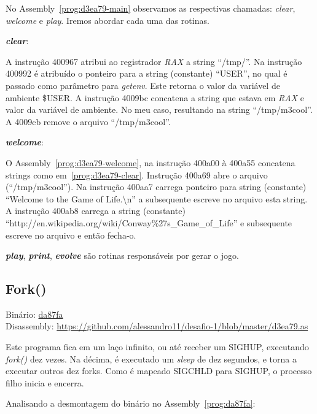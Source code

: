 No Assembly~\ref{prog:d3ea79-main} observamos as respectivas chamadas:
\emph{clear}, \emph{welcome} e \emph{play}. Iremos abordar cada uma das rotinas.\\

\par\textbf{\emph{clear}}:


A instrução 400967 atribui ao registrador \emph{RAX}
a string ``/tmp/''. Na instrução 400992 é atribuído o ponteiro para a
string (constante) ``USER'', no qual é passado como parâmetro para
\emph{getenv}. Este retorna o valor da variável de ambiente \$USER.
A instrução 4009bc concatena a string que estava em \emph{RAX} e valor da
variável de ambiente. No meu caso, resultando na string
``/tmp/m3cool''. A 4009cb remove o arquivo ``/tmp/m3cool''.\\

\par\textbf{\emph{welcome}}:


O Assembly~\ref{prog:d3ea79-welcome}, na instrução 400a00 à 400a55
concatena strings como em~\ref{prog:d3ea79-clear}. Instrução 400a69
abre o arquivo (``/tmp/m3cool''). Na instrução 400aa7 carrega ponteiro
para string (constante) ``Welcome to the Game of Life.\textbackslash n'' a
subsequente escreve no arquivo esta string. A instrução 400ab8 carrega a
string (constante) ``http://en.wikipedia.org/wiki/Conway\%27s\_Game\_of\_Life'' e
subsequente escreve no arquivo e então fecha-o.\\

\par\textbf{\emph{play}}, \textbf{\emph{print}},
\textbf{\emph{evolve}} são rotinas responsáveis por gerar o jogo.


\subsection{Fork()}
\noindent Binário: \href{https://s3.amazonaws.com/chaordic-desafio-cloud/da87fa}{da87fa}\\
Disassembly:
\href{https://github.com/alessandro11/desafio-1/blob/master/d3ea79.as}{https://github.com/alessandro11/desafio-1/blob/master/d3ea79.as}\\
\par
Este programa fica em um laço infinito, ou até receber um SIGHUP,
executando \emph{fork()} dez vezes. Na décima, é executado um
\emph{sleep} de dez segundos, e torna a executar outros dez
forks. Como é mapeado SIGCHLD para SIGHUP, o processo filho inicia e
encerra.\\
\par
Analisando a desmontagem do binário no Assembly~\ref{prog:da87fa}:

